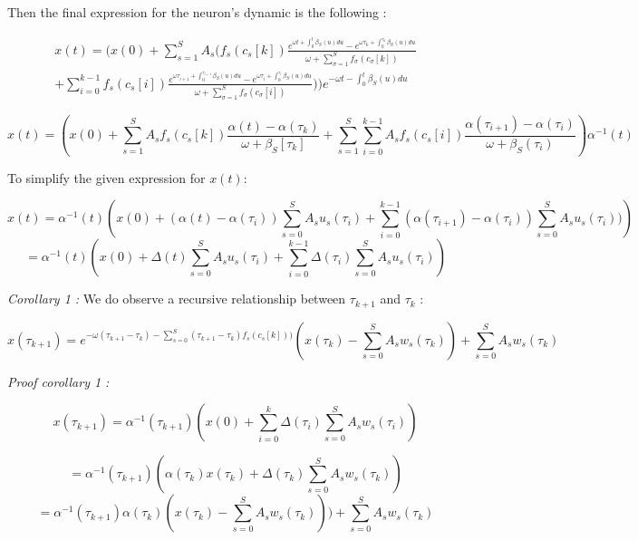 \documentclass[journal]{IEEEtran}
\begin{document}
Then the final expression for the neuron's dynamic is the following :

\begin{multline*}
 x(t)=  (x(0) + \sum_{s=1}^S A_s( f_s(c_s[k]) \frac{e^{\omega t + \int_0^t\beta_S(u)du } - e^{\omega \tau_k + \int_0^{\tau_k}\beta_S(u)du  }}{\omega + \sum_{\sigma = 1}^{S}f_\sigma(c_{\sigma}[k]) }\\ +\sum_{i=0}^{k-1} f_s(c_s[i]) \frac{e^{\omega\tau_{i+1}+ \int_0^{\tau_{i+1}}\beta_S(u)du}- e^{\omega \tau_i +  \int_0^{\tau_{i}}\beta_S(u)du}}{\omega + \sum_{\sigma = 1}^{S}f_\sigma(c_{\sigma}[i])}) ) e^{- \omega t - \int_0^t \beta_S(u) du}
\end{multline*}




\[
 x(t)=  (x(0) + \sum_{s=1}^S A_sf_s(c_s[k]) \frac{\alpha(t)-\alpha(\tau_k)}{\omega + \beta_S[\tau_k]} + \sum_{s=1}^S\sum_{i=0}^{k-1} A_sf_s(c_s[i]) \frac{\alpha(\tau_{i+1})-\alpha(\tau_i) }{\omega + \beta_S(\tau_i)})\alpha^{-1}(t)
\]



To simplify the given expression for \( x(t) \):


\[
 x(t) = \alpha^{-1}(t) \left( x(0) + \left(\alpha(t) - \alpha(\tau_{i})\right) \sum_{s=0}^{S} A_s u_s(\tau_i)  + \sum_{i=0}^{k-1} \left(\alpha(\tau_{i+1}) - \alpha(\tau_{i})\right) \sum_{s=0}^{S} A_s u_s(\tau_i) )\right)
\]
\[
 = \alpha^{-1}(t) \left( x(0) + \Delta(t)\sum_{s=0}^{S} A_s u_s(\tau_i) +\sum_{i=0}^{k-1} \Delta(\tau_i)\sum_{s=0}^{S} A_s u_s(\tau_i) \right)
\]


\textit{Corollary 1 : } We do observe a recursive relationship between $\tau_{k+1}$ and $\tau_{k}$ :

\[ x(\tau_{k+1})
 = e^{-\omega(\tau_{k+1}-\tau_k) - \sum_{s=0}^{S}(\tau_{k+1}-\tau_{k})f_s(c_s[k]))} \left(x(\tau_{k}) -\sum_{s=0}^{S} A_s w_s(\tau_{k})\right) + \sum_{s=0}^{S} A_s w_s(\tau_{k})
\]

\textit{Proof corollary 1 : }

\[
 x(\tau_{k+1})= 
 \alpha^{-1}(\tau_{k+1}) \left( x(0) + \sum_{i=0}^{k} \Delta(\tau_i)  \sum_{s=0}^{S} A_s w_s(\tau_i) \right) 
\]

\[
 = \alpha^{-1}(\tau_{k+1})\left(\alpha(\tau_{k}) x(\tau_{k}) + \Delta(\tau_{k})  \sum_{s=0}^{S} A_s w_s(\tau_{k})\right)
\]
\[
 = \alpha^{-1}(\tau_{k+1})\alpha(\tau_{k}) \left(x(\tau_{k}) -\sum_{s=0}^{S} A_s w_s(\tau_{k})\right)) + \sum_{s=0}^{S} A_s w_s(\tau_{k})
\]
\end{document}
